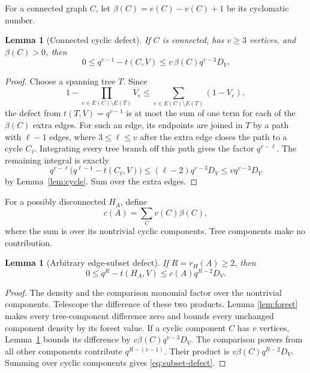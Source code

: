 \documentclass[11pt]{article}
\newtheorem{lemma}[theorem]{Lemma}
\begin{document}
For a connected graph $C$, let
$\beta(C)=e(C)-v(C)+1$ be its cyclomatic number.

\begin{lemma}[Connected cyclic defect]\label{lem:connected}
If $C$ is connected, has $v\geq3$ vertices, and $\beta(C)>0$, then
\begin{equation}
 0\leq q^{v-1}-t(C,V)
 \leq v\,\beta(C)q^{v-3}D_V.
 \label{eq:connected-defect}
\end{equation}
\end{lemma}

\begin{proof}
Choose a spanning tree $T$.  Since
\[
 1-\prod_{e\in E(C)\setminus E(T)}V_e
 \leq\sum_{e\in E(C)\setminus E(T)}(1-V_e),
\]
the defect from $t(T,V)=q^{v-1}$ is at most the sum of one term for each
of the $\beta(C)$ extra edges.  For such an edge, its endpoints are joined
in $T$ by a path with $\ell-1$ edges, where $3\leq\ell\leq v$ after the
extra edge closes the path to a cycle $C_\ell$.  Integrating every tree
branch off this path gives the factor $q^{v-\ell}$.  The remaining integral
is exactly
\[
 q^{v-\ell}\bigl(q^{\ell-1}-t(C_\ell,V)\bigr)
 \leq (\ell-2)q^{v-3}D_V
 \leq vq^{v-3}D_V
\]
by Lemma~\ref{lem:cycle}.  Sum over the extra edges.
\end{proof}

For a possibly disconnected $H_A$, define
\[
 c(A)=\sum_{C}v(C)\beta(C),
\]
where the sum is over its nontrivial cyclic components.  Tree components
make no contribution.

\begin{lemma}[Arbitrary edge-subset defect]\label{lem:subset}
If $R=r_H(A)\geq2$, then
\begin{equation}
 0\leq q^R-t(H_A,V)
 \leq c(A)q^{R-2}D_V.
 \label{eq:subset-defect}
\end{equation}
\end{lemma}

\begin{proof}
The density and the comparison monomial factor over the nontrivial
components.  Telescope the difference of these two products.  Lemma
\ref{lem:forest} makes every tree-component difference zero and bounds
every unchanged component density by its forest value.  If a cyclic
component $C$ has $v$ vertices, Lemma~\ref{lem:connected} bounds its
difference by $v\beta(C)q^{v-3}D_V$.  The comparison powers from all other
components contribute $q^{R-(v-1)}$.  Their product is
$v\beta(C)q^{R-2}D_V$.  Summing over cyclic components gives
\eqref{eq:subset-defect}.
\end{proof}
\end{document}
